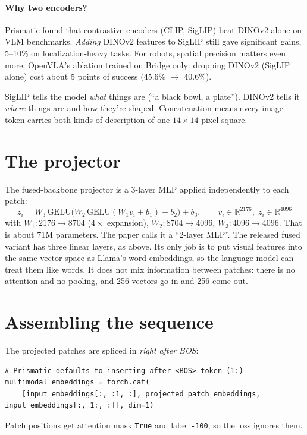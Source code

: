 \documentclass[11pt]{article}
\begin{document}
\paragraph{Why two encoders?} Prismatic \cite{karamcheti2024prismatic} found that contrastive encoders (CLIP, SigLIP) beat DINOv2 alone on VLM benchmarks. \emph{Adding} DINOv2 features to SigLIP still gave significant gains, 5--10\% on localization-heavy tasks. For robots, spatial precision matters even more. OpenVLA's ablation trained on Bridge only: dropping DINOv2 (SigLIP alone) cost about 5 points of success (45.6\% $\to$ 40.6\%).

\begin{mental}
SigLIP tells the model \emph{what} things are (``a black bowl, a plate''). DINOv2 tells it \emph{where} things are and how they're shaped. Concatenation means every image token carries both kinds of description of one $14\times14$ pixel square.
\end{mental}

\section{The projector}

The fused-backbone projector is a 3-layer MLP applied independently to each patch:
\begin{equation}
z_i = W_3\,\mathrm{GELU}\!\big(W_2\,\mathrm{GELU}(W_1 v_i + b_1) + b_2\big) + b_3,
\qquad v_i\in\mathbb{R}^{2176},\; z_i\in\mathbb{R}^{4096}
\end{equation}
with $W_1: 2176\to 8704$ ($4\times$ expansion), $W_2: 8704\to4096$, $W_3: 4096\to4096$. That is about 71M parameters. The paper calls it a ``2-layer MLP''. The released fused variant has three linear layers, as above. Its only job is to put visual features into the same vector space as Llama's word embeddings, so the language model can treat them like words. It does not mix information between patches: there is no attention and no pooling, and 256 vectors go in and 256 come out.

\section{Assembling the sequence}

The projected patches are spliced in \emph{right after BOS}:
\begin{lstlisting}
# Prismatic defaults to inserting after <BOS> token (1:)
multimodal_embeddings = torch.cat(
    [input_embeddings[:, :1, :], projected_patch_embeddings, input_embeddings[:, 1:, :]], dim=1)
\end{lstlisting}
Patch positions get attention mask \texttt{True} and label \texttt{-100}, so the loss ignores them.
\end{document}
